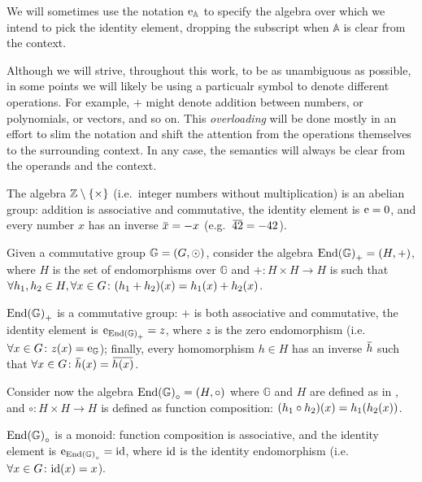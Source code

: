 We will sometimes use the notation \(\mathrm{e}_{\mathbb{A}}\) to specify the algebra over which we 
intend to pick the identity element, dropping the subscript when \(\mathbb{A}\) is clear from the 
context.
\begin{remark}  
  Although we will strive, throughout this work, to be as unambiguous as possible, in 
  some points we will likely be using a particualr symbol to denote different operations.
  For example, \(+\) might denote addition between numbers, or polynomials, or vectors, and so on.
  This \emph{overloading} will be done mostly in an effort to slim the notation and shift the 
  attention from the operations themselves to the surrounding context. 
  In any case, the semantics will always be clear from the operands and the context. 
\end{remark}

\begin{example}
  The algebra \(\mathbb{Z} \setminus \left\{\times\right\}\) (i.e.\ integer numbers without multiplication) 
  is an abelian group: addition is associative and commutative, the identity element is 
  \(\mathrm{e} = 0\), and every number \(x\) has an inverse \(\inv{x} = -x\) (e.g.\  \(\inv{42} = -42\)). 
\end{example}

\begin{example}\label{ex:endo_group}
  Given a commutative group \(\mathbb{G} = \left(G, \odot\right)\), consider the algebra 
  \(\Endset{\mathbb{G}}_{+} = \Tuple{H, +}\), where \(H\) is the set of endomorphisms over 
  \(\mathbb{G}\) and \(+\colon H \times H \to H\) is such that 
  \(\forall h_1, h_2 \in H, \forall x \in G\colon \call{\Parens*{h_1 + h_2}}{x} = 
  \call{h_1}{x} + \call{h_2}{x}\).

  \(\Endset{\mathbb{G}}_{+}\) is a commutative group: \(+\) is both associative and 
  commutative, the identity element is \(\mathrm{e}_{\mathrm{End}\left(\mathbb{G}\right)_{+}} = z\), where
  \(z\) is the zero endomorphism (i.e.\  \(\forall x \in G\colon \call{z}{x} = 
  \id_{\mathbb{G}}\)); finally, every homomorphism \(h \in H\) has an inverse 
  \(\inv{h}\) such that \(\forall x \in G\colon \call{\inv{h}}{x} = \inv{\call{h}{x}}\).
\end{example}

\begin{example}\label{ex:endo_monoid}
  Consider now the algebra \(\Endset{\mathbb{G}}_{\circ} = \Tuple{H, \circ}\) 
  where \(\mathbb{G}\) and \(H\) are defined as in , and 
  \(\circ\colon H \times H \to H\) is defined as function composition: 
  \(\call{\Parens*{h_1 \circ h_2}}{x} = \call{h_1}{\call{h_2}{x}}\).
  
  \(\Endset{\mathbb{G}}_{\circ}\) is a monoid: function composition is associative, and the 
  identity element is \(\mathrm{e}_{\mathrm{End}\left(\mathbb{G}\right)_{\circ}} = \mathrm{id} \), where \(\mathrm{id} \) is the
  identity endomorphism (i.e.\  \(\forall x \in G\colon \call{\fooid}{x} = x\)). 
\end{example}

